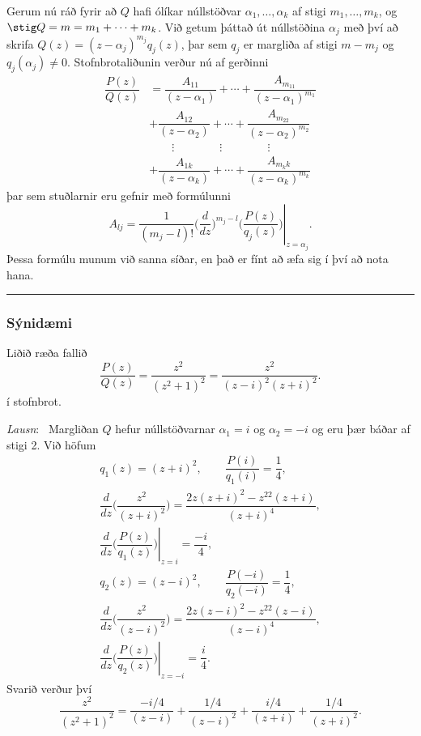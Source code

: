 Gerum nú ráð fyrir að $Q$ hafi ólíkar núllstöðvar
$\alpha_1,\dots,\alpha_k$ af stigi $m_1,\dots,m_k$,
og $\stig Q=m=m_1+\cdots+m_k$.  Við getum þáttað
út núllstöðina $\alpha_j$ með því að skrifa
$Q(z)=(z-\alpha_j)^{m_j}q_j(z)$, 
þar sem $q_j$ er margliða af stigi $m-m_j$ og $q_j(\alpha_j)\neq 0$.
Stofnbrotaliðunin verður nú af gerðinni 
\begin{align}
\dfrac{P(z)}{Q(z)}&=
\dfrac{A_{11}}{(z-\alpha_1)}+\cdots+\dfrac{A_{m_11}}{(z-\alpha_1)^{m_1}}
\label{4.4.5}\\\
&+\dfrac{A_{12}}{(z-\alpha_2)}+\cdots+\dfrac{A_{m_22}}{(z-\alpha_2)^{m_2}}\nonumber\\
&\qquad \vdots\qquad\qquad\vdots\qquad \qquad \vdots\nonumber\\
&+\dfrac{A_{1k}}{(z-\alpha_k)}+\cdots+\dfrac{A_{m_kk}}{(z-\alpha_k)^{m_k}}\nonumber
\end{align}
þar sem stuðlarnir eru gefnir með formúlunni
$$ A_{lj}=\left.\dfrac 1{(m_j-l)!}
\bigg(\dfrac {d}{dz}\bigg)^{m_j-l}\bigg(
\dfrac{P(z)}{q_j(z)}\bigg)\right|_{z=\alpha_j}.
$$
Þessa formúlu munum við sanna  síðar, en  það er fínt að æfa
sig í því að nota hana.

\bigskip\hrule\bigskip

\subsubsection{Sýnidæmi}  Liðið ræða fallið
 $$\dfrac {P(z)}{Q(z)}=\dfrac{z^2}{(z^2+1)^2}=\dfrac{z^2}{(z-i)^2(z+i)^2}.
 $$
í stofnbrot.

\smallskip\noindent
{\it Lausn}: \ 
Margliðan $Q$ hefur núllstöðvarnar $\alpha_1=i$ og $\alpha_2=-i$ og eru
þær báðar af stigi 2.  Við höfum
\begin{gather*}
q_1(z)=(z+i)^2, \qquad \dfrac{P(i)}{q_1(i)}= \dfrac 14,\\
\dfrac d{dz}\bigg(\dfrac{z^2}{(z+i)^2}\bigg)= \dfrac
{2z(z+i)^2-z^22(z+i)}{(z+i)^4},\\
\left.\dfrac d{dz}\bigg(\dfrac{P(z)}{q_1(z)}\bigg)\right|_{z=i}
=\dfrac{-i}4,\\
q_2(z)=(z-i)^2, \qquad \dfrac{P(-i)}{q_2(-i)}= \dfrac 14,\\
\dfrac d{dz}\bigg(\dfrac{z^2}{(z-i)^2}\bigg)= \dfrac
{2z(z-i)^2-z^22(z-i)}{(z-i)^4},\\
\left.\dfrac d{dz}\bigg(\dfrac{P(z)}{q_2(z)}\bigg)\right|_{z=-i}
=\dfrac{i}4.
\end{gather*}
 Svarið verður því 
 $$\dfrac{z^2}{(z^2+1)^2}=
\dfrac{-i/4}{(z-i)}+\dfrac{1/4}{(z-i)^2} +
\dfrac {i/4}{(z+i)}+\dfrac{1/4}{(z+i)^2}.
 $$



